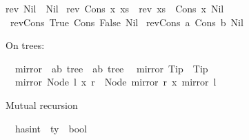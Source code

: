 \begin{isabellebody}
{\isachardoublequoteopen}rev{}\ Nil\ {\isacharequal}{\kern0pt}\ Nil{\isachardoublequoteclose}\ {\isacharbar}{\kern0pt}\isanewline
{\isachardoublequoteopen}rev{}\ {\isacharparenleft}{\kern0pt}Cons\ x\ xs{\isacharparenright}{\kern0pt}\ {\isacharequal}{\kern0pt}\ {\isacharparenleft}{\kern0pt}rev{}\ xs{\isacharparenright}{\kern0pt}\ {\isacharat}{\kern0pt}\ {\isacharparenleft}{\kern0pt}Cons\ x\ Nil{\isacharparenright}{\kern0pt}{\isachardoublequoteclose}\isanewline
\ \ \ \isanewline
{}\isamarkupfalse%
\ {\isachardoublequoteopen}rev{}{\isacharparenleft}{\kern0pt}Cons\ True\ {\isacharparenleft}{\kern0pt}Cons\ False\ Nil{\isacharparenright}{\kern0pt}{\isacharparenright}{\kern0pt}{\isachardoublequoteclose}\isanewline
{}\isamarkupfalse%
\ {\isachardoublequoteopen}rev{}{\isacharparenleft}{\kern0pt}Cons\ a\ {\isacharparenleft}{\kern0pt}Cons\ b\ Nil{\isacharparenright}{\kern0pt}{\isacharparenright}{\kern0pt}{\isachardoublequoteclose}%
\begin{isamarkuptext}%
On trees:%
\end{isamarkuptext}\isamarkuptrue%
\isamarkupfalse%
\isanewline
\ \ mirror\ {\isacharcolon}{\kern0pt}{\isacharcolon}{\kern0pt}\ {\isachardoublequoteopen}{\isacharparenleft}{\kern0pt}{\isacharprime}{\kern0pt}a{\isacharcomma}{\kern0pt}{\isacharprime}{\kern0pt}b{\isacharparenright}{\kern0pt}\ tree\ {\isacharequal}{\kern0pt}{\isachargreater}{\kern0pt}\ {\isacharparenleft}{\kern0pt}{\isacharprime}{\kern0pt}a{\isacharcomma}{\kern0pt}{\isacharprime}{\kern0pt}b{\isacharparenright}{\kern0pt}\ tree{\isachardoublequoteclose}\isanewline
{}\isanewline
\ \ {\isachardoublequoteopen}mirror\ Tip\ {\isacharequal}{\kern0pt}\ Tip{\isachardoublequoteclose}\ {\isacharbar}{\kern0pt}\isanewline
\ \ {\isachardoublequoteopen}mirror\ {\isacharparenleft}{\kern0pt}Node\ l\ x\ r{\isacharparenright}{\kern0pt}\ {\isacharequal}{\kern0pt}\ Node\ {\isacharparenleft}{\kern0pt}mirror\ r{\isacharparenright}{\kern0pt}\ x\ {\isacharparenleft}{\kern0pt}mirror\ l{\isacharparenright}{\kern0pt}{\isachardoublequoteclose}\isanewline
\isanewline
{}\isamarkupfalse%
%
\begin{isamarkuptext}%
Mutual recursion%
\end{isamarkuptext}\isamarkuptrue%
\isamarkupfalse%
\isanewline
\ \ has{\isacharunderscore}{\kern0pt}int\ {\isacharcolon}{\kern0pt}{\isacharcolon}{\kern0pt}\ {\isachardoublequoteopen}ty\ {\isasymRightarrow}\ bool{\isachardoublequoteclose}\ \isanewline

\end{isabellebody}
